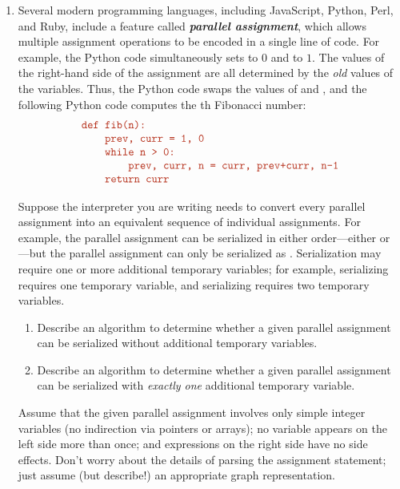 \begin{exercises}
\begin{enumerate}[label=\arabic*.,ref=\thechapter.\arabic*,leftmargin=*,align=left,itemsep=1.5ex plus 0.5ex,start=0]
\item Several modern programming languages, including JavaScript, Python, Perl, and Ruby, include a feature called \textbf{\textit{parallel assignment}}, which allows multiple assignment operations to be encoded in a single line of code.
For example, the Python code  simultaneously sets  to $0$ and  to $1$.
The values of the right-hand side of the assignment are all determined by the \textit{old} values of the variables.
Thus, the Python code  swaps the values of  and , and the following Python code computes the th Fibonacci number:
\[
\begin{array}{l}
\mbox{\Str{def fib(n):}}\\
\mbox{\Str{\hspace*{2em}prev, curr = 1, 0}}\\
\mbox{\Str{\hspace*{2em}while n > 0:}}\\
\mbox{\Str{\hspace*{4em}prev, curr, n = curr, prev+curr, n-1}}\\
\mbox{\Str{\hspace*{2em}return curr}}
\end{array}
\]

Suppose the interpreter you are writing needs to convert every parallel assignment into an equivalent sequence of individual assignments.
For example, the parallel assignment  can be serialized in either order---either  or ---but the parallel assignment  can only be serialized as .
Serialization may require one or more additional temporary variables; for example, serializing  requires one temporary variable, and serializing  requires two temporary variables.
\begin{enumerate}
\item Describe an algorithm to determine whether a given parallel assignment can be serialized without additional temporary variables.
\item Describe an algorithm to determine whether a given parallel assignment can be serialized with \textit{exactly one} additional temporary variable.
\end{enumerate}
Assume that the given parallel assignment involves only simple integer variables (no indirection via pointers or arrays); no variable appears on the left side more than once; and expressions on the right side have no side effects.
Don’t worry about the details of parsing the assignment statement; just assume (but describe!) an appropriate graph representation.
\end{enumerate}


\end{exercises}
